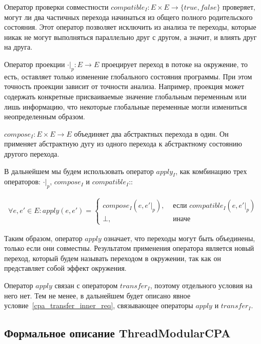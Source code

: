 Оператор проверки совместности $compatible_I: E \times E \rightarrow \{true, false\}$ проверяет, могут ли два частичных перехода начинаться из общего полного родительского состояния. 
Этот оператор позволяет исключить из анализа те переходы, которые никак не могут выполняться параллельно друг с другом, а значит, и влиять друг на друга.

Оператор проекции $\cdot|_p: E \rightarrow E$ проецирует переход в потоке на окружение, то есть, оставляет только изменение глобального состояния программы. 
При этом точность проекции зависит от точности анализа.
Например, проекция может содержать конкретные присваиваемые значение глобальным переменным или лишь информацию, что некоторые глобальные переменные могли измениться неопределенным образом. 

$compose_I: E \times E \rightarrow E$ объединяет два абстрактных перехода в один. Он применяет абстрактную дугу из одного перехода к абстрактному состоянию другого перехода. 

В дальнейшем мы будем использовать оператор $apply_I$, как комбинацию трех операторов: $\cdot|_p$, $compose_I$ и $compatible_I$::

\begin{equation}
\label{apply_function}
\begin{aligned}
\forall e, e' \in E: apply(e, e') = 
\begin{cases}
compose_{I}(e, e'|_p), &\mbox{ если } compatible_I(e, e'|_p) \\
\bot, & \mbox{ иначе}
\end{cases}
\end{aligned}
\end{equation}

Таким образом, оператор $apply$ означает, что переходы могут быть объединены, только если они совместны. Результатом применения оператора является новый переход, который будем называть переходом в окружении, так как он представляет собой эффект окружения.

Оператор $apply$ связан с оператором $transfer_I$, поэтому отдельного условия на него нет.
Тем не менее, в дальнейшем будет описано явное условие~\ref{cpa_transfer_inner_req}, связывающее операторы $apply$ и $transfer_I$.


\subsection{Формальное описание ThreadModularCPA}

